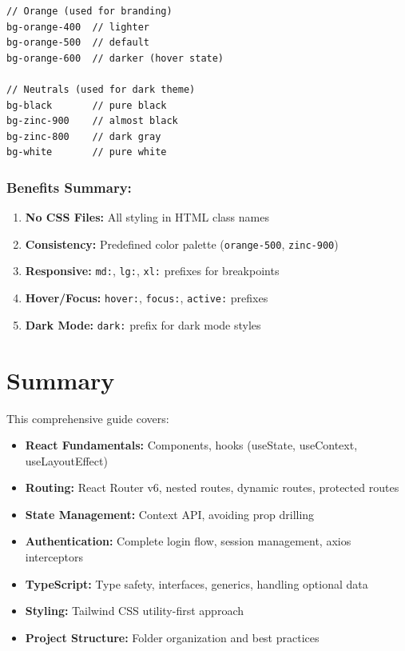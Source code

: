 \documentclass[12pt]{article}
\begin{document}
\begin{lstlisting}
// Orange (used for branding)
bg-orange-400  // lighter
bg-orange-500  // default
bg-orange-600  // darker (hover state)

// Neutrals (used for dark theme)
bg-black       // pure black
bg-zinc-900    // almost black
bg-zinc-800    // dark gray
bg-white       // pure white
\end{lstlisting}

\subsubsection*{Benefits Summary:}

\begin{enumerate}
    \item \textbf{No CSS Files:} All styling in HTML class names
    \item \textbf{Consistency:} Predefined color palette (\texttt{orange-500}, \texttt{zinc-900})
    \item \textbf{Responsive:} \texttt{md:}, \texttt{lg:}, \texttt{xl:} prefixes for breakpoints
    \item \textbf{Hover/Focus:} \texttt{hover:}, \texttt{focus:}, \texttt{active:} prefixes
    \item \textbf{Dark Mode:} \texttt{dark:} prefix for dark mode styles
\end{enumerate}


\section*{Summary}

This comprehensive guide covers:

\begin{itemize}
    \item \textbf{React Fundamentals:} Components, hooks (useState, useContext, useLayoutEffect)
    \item \textbf{Routing:} React Router v6, nested routes, dynamic routes, protected routes
    \item \textbf{State Management:} Context API, avoiding prop drilling
    \item \textbf{Authentication:} Complete login flow, session management, axios interceptors
    \item \textbf{TypeScript:} Type safety, interfaces, generics, handling optional data
    \item \textbf{Styling:} Tailwind CSS utility-first approach
    \item \textbf{Project Structure:} Folder organization and best practices
\end{itemize}
\end{document}
